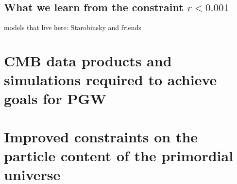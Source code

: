 \subsection{What we learn from the constraint $r<0.001$}

models that live here: Starobinsky and friends

\section{CMB data products and simulations required to achieve goals for PGW}
\label{sec:needs}

\section{Improved constraints on the particle content of the primordial universe}
\label{sec:scalar}

